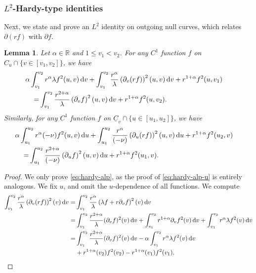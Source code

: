 \documentclass[10pt, reqno]{amsart}
\newtheorem{lemma}[theorem]{Lemma}
\theoremstyle{definition}
\theoremstyle{remark}
\theoremstyle{conjecture}
\numberwithin{equation}{section}
\newcommand{\set}[1]{\{#1\}}
\newcommand{\ud}{\mathrm{d}}
\newcommand{\rd}{\partial}
\newcommand{\0}{\emptyset}
\newcommand{\alp}{\alpha}
\newcommand{\lmb}{\lambda}
\newcommand{\bbR}{\mathbb R}
\newcommand{\uC}{\underline{C}}
\newcommand{\dur}{\nu}
\newcommand{\dvr}{\lmb}
\begin{document}
\subsubsection*{$L^{2}$-Hardy-type identities}
Next, we state and prove an $L^{2}$ identity on outgoing null curves, which relates $\rd(r f)$ with $\rd f$. 
\begin{lemma} \label{lem:hardy-type}
Let $\alp \in \bbR$ and $1 \leq v_{1} < v_{2}$. For any $C^{1}$ function $f$ on $C_{u} \cap \set{v \in [v_{1}, v_{2}]}$, we have
\begin{equation} \label{eq:hardy-alp}
\begin{aligned}
& \hskip-2em
	\alp \int_{v_{1}}^{v_{2}} r^{\alp} \dvr f^{2} (u, v) \, \ud v
	+ \int_{v_{1}}^{v_{2}} \frac{r^{\alp}}{\dvr} \left(\rd_{v} (r f)\right)^{2} (u, v) \, \ud v 
	+ r^{1+\alp} f^{2}(u, v_{1}) \\
	= & \int_{v_{1}}^{v_{2}} \frac{r^{2+\alp}}{\dvr} \left(\rd_{v} f \right)^{2} (u, v) \, \ud v 
		 + r^{1+\alp} f^{2}(u, v_{2}).
\end{aligned}
\end{equation}
Similarly, for any $C^{1}$ function $f$ on $\uC_{v} \cap \set{u \in [u_{1}, u_{2}]}$, we have
\begin{equation} \label{eq:hardy-alp-u}
\begin{aligned}
& \hskip-2em
	\alp \int_{u_{1}}^{u_{2}} r^{\alp} (-\dur) f^{2} (u, v) \, \ud u
	+ \int_{u_{1}}^{u_{2}} \frac{r^{\alp}}{(-\dur)} \left(\rd_{u} (r f)\right)^{2} (u, v) \, \ud u 
	+ r^{1+\alp} f^{2}(u_{2}, v) \\
	= & \int_{u_{1}}^{u_{2}} \frac{r^{2+\alp}}{(-\dur)} \left(\rd_{u} f \right)^{2} (u, v) \, \ud u 
		 + r^{1+\alp} f^{2}(u_{1}, v).
\end{aligned}
\end{equation}
\end{lemma}
\begin{proof}
We only prove \eqref{eq:hardy-alp}, as the proof of \eqref{eq:hardy-alp-u} is entirely analogous.
We fix $u$, and omit the $u$-dependence of all functions. 
We compute
\begin{align*}
	\int_{v_{1}}^{v_{2}} \frac{r^{\alp}}{\dvr} \left(\rd_{v} (r f)\right)^{2} (v) \, \ud v
	= & \int_{v_{1}}^{v_{2}} \frac{r^{\alp}}{\dvr} \left(\dvr f + r \rd_{v} f \right)^{2} (v) \, \ud v \\
	= & \int_{v_{1}}^{v_{2}} \frac{r^{2+\alp}}{\dvr} (\rd_{v} f )^{2} (v) \, \ud v
	+ \int_{v_{1}}^{v_{2}} r^{1+\alp} \rd_{v} f^{2} (v) \, \ud v 
	+ \int_{v_{1}}^{v_{2}} r^{\alp} \dvr f^{2} (v)\, \ud v \\
	= & \int_{v_{1}}^{v_{2}} \frac{r^{2+\alp}}{\dvr} (\rd_{v} f )^{2} (v) \, \ud v - \alp \int_{v_{1}}^{v_{2}} r^{\alp} \dvr f^{2} (v) \, \ud v \\
	& + r^{1+\alp}(v_{2}) f^{2}(v_{2}) - r^{1+\alp}(v_{1}) f^{2}(v_{1}).		\qedhere
\end{align*}
\end{proof}
\end{document}
